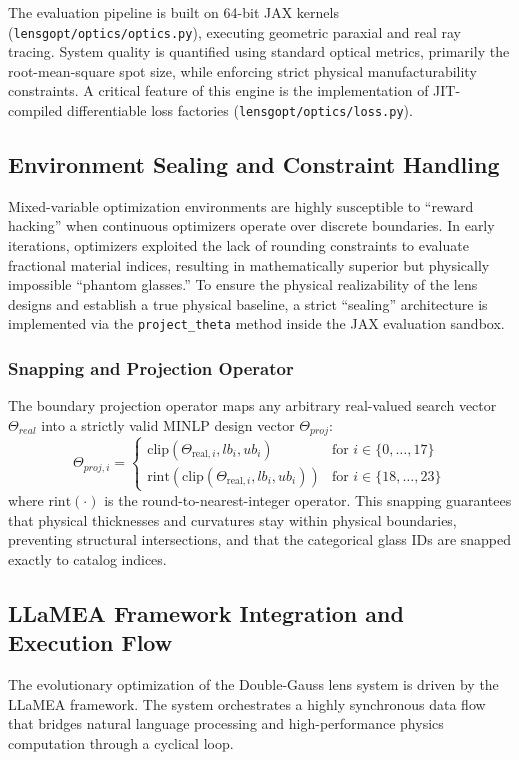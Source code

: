 \documentclass[12pt]{article}
\begin{document}
The evaluation pipeline is built on 64-bit JAX kernels (\texttt{lensgopt/optics/optics.py}), executing geometric paraxial and real ray tracing. System quality is quantified using standard optical metrics, primarily the root-mean-square spot size, while enforcing strict physical manufacturability constraints. A critical feature of this engine is the implementation of JIT-compiled differentiable loss factories (\texttt{lensgopt/optics/loss.py}).

\subsection{Environment Sealing and Constraint Handling}
Mixed-variable optimization environments are highly susceptible to ``reward hacking'' when continuous optimizers operate over discrete boundaries. In early iterations, optimizers exploited the lack of rounding constraints to evaluate fractional material indices, resulting in mathematically superior but physically impossible ``phantom glasses.'' To ensure the physical realizability of the lens designs and establish a true physical baseline, a strict ``sealing'' architecture is implemented via the \texttt{project\_theta} method inside the JAX evaluation sandbox.

\subsubsection{Snapping and Projection Operator}
The boundary projection operator maps any arbitrary real-valued search vector $\Theta_{real}$ into a strictly valid MINLP design vector $\Theta_{proj}$:
\[
\Theta_{proj, i} =
\begin{cases} 
\text{clip}\left(\Theta_{\text{real}, i}, lb_i, ub_i\right) & \text{for } i \in \{0, \dots, 17\} \\
\text{rint}\left(\text{clip}\left(\Theta_{\text{real}, i}, lb_i, ub_i\right)\right) & \text{for } i \in \{18, \dots, 23\}
\end{cases}
\]
where $\text{rint}(\cdot)$ is the round-to-nearest-integer operator. This snapping guarantees that physical thicknesses and curvatures stay within physical boundaries, preventing structural intersections, and that the categorical glass IDs are snapped exactly to catalog indices.

\subsection{LLaMEA Framework Integration and Execution Flow}
The evolutionary optimization of the Double-Gauss lens system is driven by the LLaMEA framework. The system orchestrates a highly synchronous data flow that bridges natural language processing and high-performance physics computation through a cyclical loop.
\end{document}
